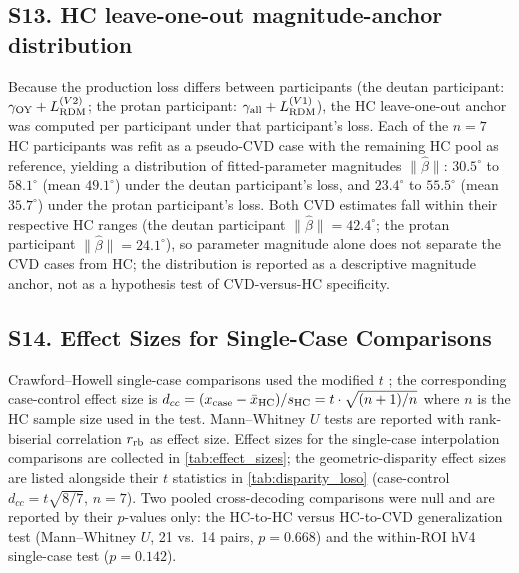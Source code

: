 
\subsection*{\textbf{S13. HC leave-one-out magnitude-anchor distribution}}
\label{app:hc_perm}

Because the production loss differs between participants (the deutan participant: $\gamma_{\rm OY} + L_{\rm RDM}^{(V2)}$; the protan participant: $\gamma_{\rm all} + L_{\rm RDM}^{(V1)}$), the HC leave-one-out anchor was computed per participant under that participant's loss. Each of the $n = 7$ HC participants was refit as a pseudo-CVD case with the remaining HC pool as reference, yielding a distribution of fitted-parameter magnitudes $\|\hat\beta\|$: $30.5^\circ$ to $58.1^\circ$ (mean $49.1^\circ$) under the deutan participant's loss, and $23.4^\circ$ to $55.5^\circ$ (mean $35.7^\circ$) under the protan participant's loss.
Both CVD estimates fall within their respective HC ranges (the deutan participant $\|\hat\beta\| = 42.4^\circ$; the protan participant $\|\hat\beta\| = 24.1^\circ$), so parameter magnitude alone does not separate the CVD cases from HC; the distribution is reported as a descriptive magnitude anchor, not as a hypothesis test of CVD-versus-HC specificity.


\subsection*{\textbf{S14. Effect Sizes for Single-Case Comparisons}}
\label{app:effect_sizes}

Crawford--Howell single-case comparisons used the modified $t$ ; the corresponding case-control effect size is $d_{cc} = (x_{\rm case} - \bar{x}_{\rm HC}) / s_{\rm HC} = t \cdot \sqrt{(n+1)/n}$ where $n$ is the HC sample size used in the test.
Mann--Whitney $U$ tests are reported with rank-biserial correlation $r_{\rm rb}$ as effect size.
Effect sizes for the single-case interpolation comparisons are collected in \cref{tab:effect_sizes}; the geometric-disparity effect sizes are listed alongside their $t$ statistics in \cref{tab:disparity_loso} (case-control $d_{cc} = t\sqrt{8/7}$, $n = 7$). Two pooled cross-decoding comparisons were null and are reported by their $p$-values only: the HC-to-HC versus HC-to-CVD generalization test (Mann--Whitney $U$, 21 vs.\ 14 pairs, $p = 0.668$) and the within-ROI hV4 single-case test ($p = 0.142$).

